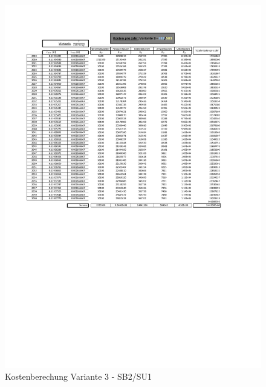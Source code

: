 \begin{figure}[h!]
	\centering
	\includegraphics[width=\textwidth]{figures/Anhang/f-00-A-V3-B2-U1}
	\caption{Kostenberechung Variante 3 - SB2/SU1}
\end{figure}

